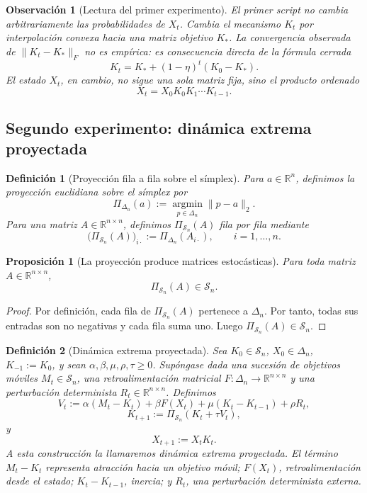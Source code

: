 \documentclass[12pt]{article}
\newtheorem{definicion}{Definición}[section]
\newtheorem{proposicion}{Proposición}[section]
\newtheorem{observacion}{Observación}[section]
\begin{document}
\begin{observacion}[Lectura del primer experimento]
El primer script no cambia arbitrariamente las probabilidades de \(X_t\).
Cambia el mecanismo \(K_t\) por interpolación convexa hacia una matriz objetivo
\(K_\ast\). La convergencia observada de \(\|K_t-K_\ast\|_F\) no es empírica:
es consecuencia directa de la fórmula cerrada
\[
K_t=K_\ast+(1-\eta)^t(K_0-K_\ast).
\]
El estado \(X_t\), en cambio, no sigue una sola matriz fija, sino el producto
ordenado
\[
X_t=X_0K_0K_1\cdots K_{t-1}.
\]
\end{observacion}

\subsection{Segundo experimento: dinámica extrema proyectada}

\begin{definicion}[Proyección fila a fila sobre el símplex]
Para \(a\in\mathbb R^n\), definimos la proyección euclidiana sobre el símplex
por
\[
\Pi_{\Delta_n}(a)
:=
\operatorname*{argmin}_{p\in\Delta_n}\|p-a\|_2.
\]
Para una matriz \(A\in\mathbb R^{n\times n}\), definimos
\(\Pi_{\mathcal S_n}(A)\) fila por fila mediante
\[
\bigl(\Pi_{\mathcal S_n}(A)\bigr)_{i\cdot}
:=
\Pi_{\Delta_n}(A_{i\cdot}),
\qquad i=1,\dots,n.
\]
\end{definicion}

\begin{proposicion}[La proyección produce matrices estocásticas]
Para toda matriz \(A\in\mathbb R^{n\times n}\),
\[
\Pi_{\mathcal S_n}(A)\in\mathcal S_n.
\]
\end{proposicion}

\begin{proof}
Por definición, cada fila de \(\Pi_{\mathcal S_n}(A)\) pertenece a
\(\Delta_n\). Por tanto, todas sus entradas son no negativas y cada fila suma
uno. Luego \(\Pi_{\mathcal S_n}(A)\in\mathcal S_n\).
\end{proof}

\begin{definicion}[Dinámica extrema proyectada]
Sea \(K_0\in\mathcal S_n\), \(X_0\in\Delta_n\), \(K_{-1}:=K_0\), y sean
\(\alpha,\beta,\mu,\rho,\tau\geq 0\). Supóngase dada una sucesión de objetivos
móviles \(M_t\in\mathcal S_n\), una retroalimentación matricial
\(F:\Delta_n\to\mathbb R^{n\times n}\) y una perturbación determinista
\(R_t\in\mathbb R^{n\times n}\). Definimos
\[
V_t
:=
\alpha(M_t-K_t)
+
\beta F(X_t)
+
\mu(K_t-K_{t-1})
+
\rho R_t,
\]
\[
K_{t+1}
:=
\Pi_{\mathcal S_n}(K_t+\tau V_t),
\]
y
\[
X_{t+1}:=X_tK_t.
\]
A esta construcción la llamaremos dinámica extrema proyectada. El término
\(M_t-K_t\) representa atracción hacia un objetivo móvil; \(F(X_t)\),
retroalimentación desde el estado; \(K_t-K_{t-1}\), inercia; y \(R_t\), una
perturbación determinista externa.
\end{definicion}
\end{document}
